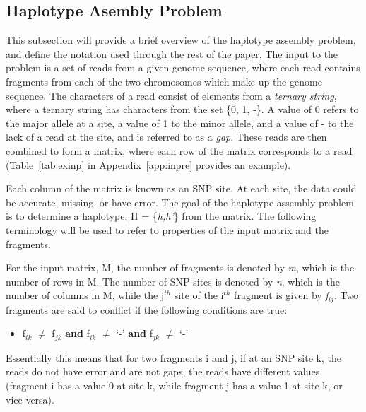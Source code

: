 \documentclass[10pt,twocolumn]{article}
\begin{document}
\subsection{Haplotype Asembly Problem} \label{sec:hap}

This subsection will provide a brief overview of the haplotype assembly problem, and define the
notation used through the rest of the paper. The input to the problem is a set of reads from a given genome
sequence, where each read contains fragments from each of the two chromosomes which make up the genome
sequence. The characters of a read consist of elements from a \textit{ternary string}, where a ternary
string has characters from the set \{0, 1, -\}. A value of 0 refers to the major allele
at a site, a value of 1 to the minor allele, and a value of - to the lack of a read at the site, and is
referred to as a \textit{gap}. These reads are then combined to form a matrix, where each row of the 
matrix corresponds to a read (Table~\ref{tab:exinp} in Appendix~\ref{app:inpre} provides an example). 

Each column of the matrix is known as an SNP site. At each site, the data could be accurate, missing, or have
error. The goal of the haplotype assembly problem is to determine a haplotype, H = \{\textit{h,h'}\}
from the matrix. The following terminology will be used to refer to properties of the input matrix and the
fragments. 

For the input matrix, M, the number of fragments is denoted by \textit{m}, which is the number of rows in M.
The number of SNP sites is denoted by \textit{n}, which is the number of columns in M, while the j$^{th}$ 
site of the i$^{th}$ fragment is given by \textit{f$_{ij}$}. Two fragments are said to 
conflict if the following conditions are true:
\begin{itemize}
    \item{f$_{ik}$ $\neq$ f$_{jk}$ \textbf{and} f$_{ik}$ $\neq$ `-' \textbf{and} f$_{jk}$ $\neq$ `-' }
\end{itemize}
Essentially this means that for two fragments i and j, if at an SNP site k, the reads do not have error and are 
not gaps, the reads have different values (fragment i has a value 0 at site k, while fragment j has a value 
1 at site k, or vice versa). 
\end{document}
